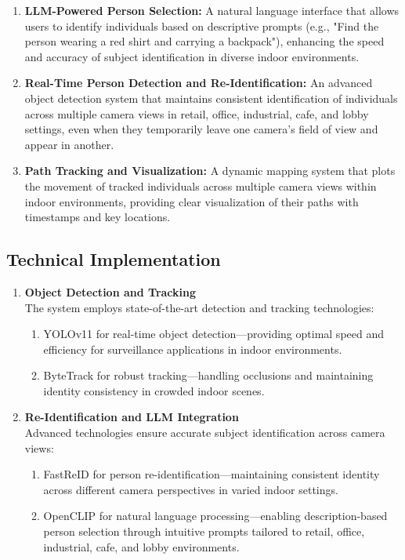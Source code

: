 \begin{enumerate}[leftmargin=80pt]
    \item \textbf{LLM-Powered Person Selection:} A natural language interface that allows users to identify individuals
    based on descriptive prompts (e.g., "Find the person wearing a red shirt and carrying a backpack"), enhancing the speed
    and accuracy of subject identification in diverse indoor environments.
    \item \textbf{Real-Time Person Detection and Re-Identification:} An advanced object detection system that maintains
    consistent identification of individuals across multiple camera views in retail, office, industrial, cafe, and lobby settings,
    even when they temporarily leave one camera's field of view and appear in another.
    \item \textbf{Path Tracking and Visualization:} A dynamic mapping system that plots the movement of tracked individuals
    across multiple camera views within indoor environments, providing clear visualization of their paths with timestamps and key locations.
\end{enumerate}

\subsection{Technical Implementation}
\label{subsection:technical-implementation}

\begin{enumerate}[leftmargin=80pt]
    \item \textbf{Object Detection and Tracking} \\%
        The system employs state-of-the-art detection and tracking technologies:
        \begin{enumerate}
            \item YOLOv11 for real-time object detection—providing optimal speed and efficiency for surveillance applications in indoor environments.
            \item ByteTrack for robust tracking—handling occlusions and maintaining identity consistency in crowded indoor scenes.
        \end{enumerate}
    \item \textbf{Re-Identification and LLM Integration} \\%
        Advanced technologies ensure accurate subject identification across camera views:
        \begin{enumerate}
            \item FastReID for person re-identification—maintaining consistent identity across different camera perspectives in varied indoor settings.
            \item OpenCLIP for natural language processing—enabling description-based person selection through intuitive prompts tailored to retail, office, industrial, cafe, and lobby environments.
        \end{enumerate}
\end{enumerate}

